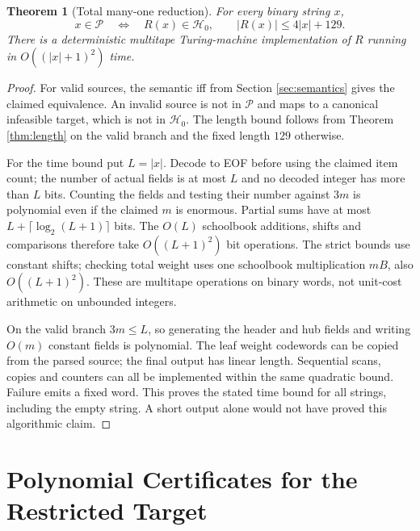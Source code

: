 \documentclass[11pt]{article}
\newtheorem{theorem}[definition]{Theorem}
\theoremstyle{remark}
\newcommand{\Hstar}{\mathcal H_0}
\begin{document}
\begin{theorem}[Total many-one reduction]\label{thm:reduction}
For every binary string $x$,
\[
 x\in\mathcal P\quad\Longleftrightarrow\quad R(x)\in\Hstar,
 \qquad |R(x)|\le4|x|+129.
\]
There is a deterministic multitape Turing-machine implementation of $R$
running in $O((|x|+1)^2)$ time.
\end{theorem}
\begin{proof}
For valid sources, the semantic iff from Section \ref{sec:semantics} gives
the claimed equivalence. An invalid source is not in $\mathcal P$ and maps
to a canonical infeasible target, which is not in $\Hstar$.
The length bound follows from Theorem \ref{thm:length} on the valid branch
and the fixed length $129$ otherwise.

For the time bound put $L=|x|$. Decode to EOF before using the claimed
item count; the number of actual fields is at most $L$ and no decoded
integer has more than $L$ bits. Counting the fields and testing their
number against $3m$ is polynomial even if the claimed $m$ is enormous.
Partial sums have at most $L+\lceil\log_2(L+1)\rceil$ bits. The $O(L)$
schoolbook additions, shifts and comparisons therefore take $O((L+1)^2)$
bit operations. The strict bounds use constant shifts; checking total
weight uses one schoolbook multiplication $mB$, also $O((L+1)^2)$.
These are multitape operations on binary words, not unit-cost arithmetic
on unbounded integers.

On the valid branch $3m\le L$, so generating the header and hub fields
and writing $O(m)$ constant fields is polynomial. The leaf weight codewords
can be copied from the parsed source; the final output has linear length.
Sequential scans, copies and counters can all be implemented within the
same quadratic bound. Failure emits a fixed word. This proves the stated
time bound for all strings, including the empty string. A short output
alone would not have proved this algorithmic claim.
\end{proof}

\section{Polynomial Certificates for the Restricted Target}
\label{sec:np}
\end{document}
